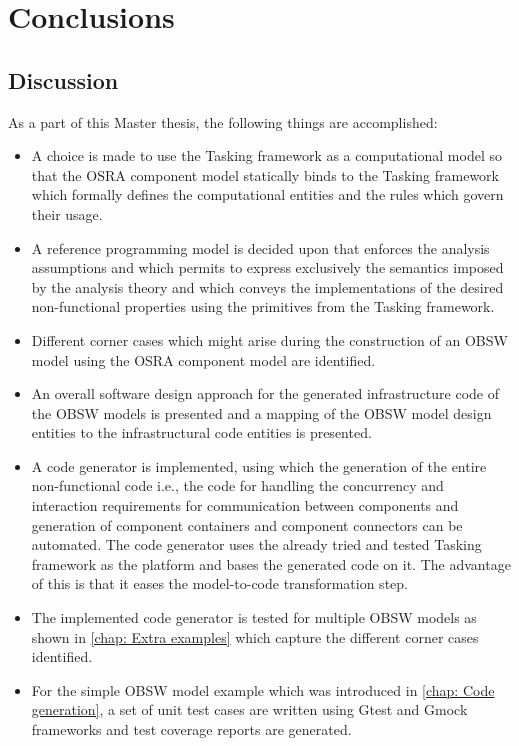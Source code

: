 
\chapter{Conclusions}
\label{chap:conclusion}

\section{Discussion}
As a part of this Master thesis, the following things are accomplished:
\begin{itemize}
\item A choice is made to use the Tasking framework as a computational model so that the OSRA component model statically binds to the Tasking framework which formally defines the computational entities and the rules which govern their usage. 
\item A reference programming model is decided upon that enforces the analysis assumptions and which permits to express exclusively the semantics imposed by the analysis theory and which conveys the implementations of the desired non-functional properties using the primitives from the Tasking framework.
\item Different corner cases which might arise during the construction of an OBSW model using the OSRA component model are identified. 
\item An overall software design approach for the generated infrastructure code of the OBSW models is presented and a mapping of the OBSW model design entities to the infrastructural code entities is presented.  
\item A code generator is implemented, using which the generation of the entire non-functional code i.e., the code for handling the concurrency and interaction requirements for communication between components and generation of component containers and component connectors can be automated. The code generator uses the already tried and tested Tasking framework as the platform and bases the generated code on it. The advantage of this is that it eases the model-to-code transformation step. 
\item The implemented code generator is tested for multiple OBSW models as shown in \cref{chap: Extra examples} which capture the different corner cases identified.
\item For the simple OBSW model example which was introduced in \cref{chap: Code generation}, a set of unit test cases are written using Gtest and Gmock frameworks \cite{GoogleMock} and test coverage reports are generated.
\end{itemize}


